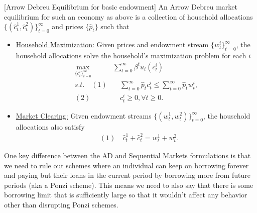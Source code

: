 \documentclass[11pt,english]{article}
\begin{document}
\begin{definition}{[Arrow Debreu Equilibrium for basic endowment]} An Arrow Debreu market equilibrium for such an economy as above is a collection of household allocations $\{( \hat{c}_t^1,\hat{c}_t^2)\}_{t=0}^\infty$ and prices $\{\hat{p}_t\}$ such that 
\begin{itemize}
\item \underline{Household Maximization:} Given prices and endowment stream $\{w_t^i\}_{t = 0}^\infty$, the household allocations solve the household's maximization problem for each $i$ \begin{align*}
\max_{\{c_t^i\}_{t=0}^\infty} &\sum_{t=0}^\infty \beta^t u_i(c_t^i)\\
s.t.\quad  (1)&\quad \sum_{t=0}^\infty \hat{p}_t c_t^i \leq \sum_{t=0}^\infty \hat{p}_t w_t^i,\\
(2)&\quad c_t^i \geq 0, \forall t\geq 0.
\end{align*}
\item \underline{Market Clearing:} Given endowment streams $\{(w_t^1, w_t^2)\}_{t = 0}^\infty$, the household allocations also satisfy \begin{align*}
&(1)\quad \hat{c}_t^1 + \hat{c}_t^2 = w_t^1 + w_t^2.
\end{align*}
\end{itemize}
\end{definition}
One key difference between the AD and Sequential Markets formulations is that we need to rule out schemes where an individual can keep on borrowing forever and paying but their loans in the current period by borrowing more from future periods (aka a Ponzi scheme). This means we need to also say that there is some borrowing limit that is sufficiently large so that it wouldn't affect any behavior other than disrupting Ponzi schemes.
\end{document}
